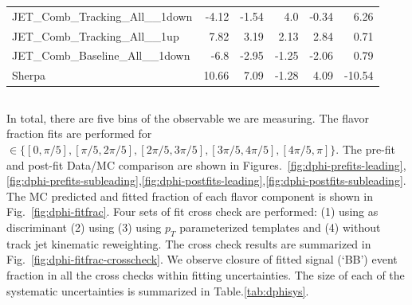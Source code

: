 \begin{table}[htbp]
{\begin{tabular}{lrrrrr}
JET\_Comb\_Tracking\_All\_\_1down                     & -4.12             & -1.54  & 4.0   & -0.34 & 6.26   \\
JET\_Comb\_Tracking\_All\_\_1up                       & 7.82              & 3.19   & 2.13  & 2.84  & 0.71   \\
JET\_Comb\_Baseline\_All\_\_1down                     & -6.8              & -2.95  & -1.25 & -2.06 & 0.79   \\
Sherpa                                                & 10.66             & 7.09   & -1.28 & 4.09  & -10.54 \\
\end{tabular}}
\end{table}


\clearpage
\subsection{\dphi}

In total, there are five bins of the \dphi observable we are measuring. The flavor fraction fits are performed for \dphi $\in\{[0, \pi/5], [\pi/5, 2\pi/5], [2\pi/5, 3\pi/5], [3\pi/5, 4\pi/5], [4\pi/5, \pi]\}$. The pre-fit and post-fit Data/MC comparison are shown in Figures.~\ref{fig:dphi-prefits-leading},\ref{fig:dphi-prefits-subleading},\ref{fig:dphi-postfits-leading},\ref{fig:dphi-postfits-subleading}. The MC predicted and fitted fraction of each flavor component is shown in Fig.~\ref{fig:dphi-fitfrac}. Four sets of fit cross check are performed: (1) using \sdzero as discriminant (2) using \subsubsdzero (3) using $p_T$ parameterized templates and (4) without track jet kinematic reweighting. The cross check results are summarized in Fig.~\ref{fig:dphi-fitfrac-crosscheck}. We observe closure of fitted signal (`BB') event fraction in all the cross checks within fitting uncertainties. The size of each of the systematic uncertainties is summarized in Table.\ref{tab:dphisys}.


